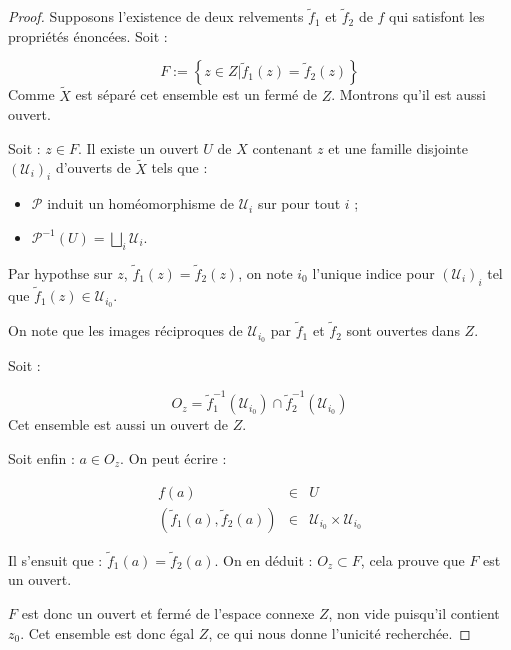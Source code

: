 \begin{proof}
Supposons l'existence de deux relvements $\tilde{f}_1$ et $\tilde{f}_2$ de $f$ qui satisfont les propri\'et\'es \'enonc\'ees. Soit :

\[F:=\left\{z\in Z|\tilde{f}_1(z)=\tilde{f}_2(z)\right\}\]
Comme $\tilde{X}$ est s\'epar\'e cet ensemble est un ferm\'e de $Z$. Montrons qu'il est aussi ouvert.

\par
Soit : $z\in F$. Il existe un ouvert $U$ de $X$ contenant $z$ et une famille disjointe $(\mathcal{U}_i)_i$ d'ouverts de $\tilde{X}$ tels que :

\begin{itemize}
\item $\mathcal{P}$ induit un hom\'eomorphisme de $\mathcal{U}_i$ sur pour tout $i$ ;
\item $\mathcal{P}^{-1}(U)=\bigsqcup\limits_i \mathcal{U}_i$.
\end{itemize}

Par hypothse sur $z$, $\tilde{f}_1(z)=\tilde{f}_2(z)$, on note $i_0$ l'unique indice pour $(\mathcal{U}_i)_i$ tel que $\tilde{f}_1(z)\in\mathcal{U}_{i_0}$.

\par
On note que les images r\'eciproques de $\mathcal{U}_{i_0}$ par $\tilde{f}_1$ et $\tilde{f}_2$ sont ouvertes dans $Z$.

\par
Soit :

\[O_z=\tilde{f}_1^{-1}(\mathcal{U}_{i_0})\cap \tilde{f}_2^{-1}(\mathcal{U}_{i_0})\]
Cet ensemble est aussi un ouvert de $Z$.

Soit enfin : $a\in O_z$. On peut \'ecrire :

\[%
\begin{array}{ccc}
f(a)&\in&U\\
(\tilde{f}_1(a),\tilde{f}_2(a))&\in&\mathcal{U}_{i_0}\times\mathcal{U}_{i_0}
\end{array}
\]

Il s'ensuit que : $\tilde{f}_1(a)=\tilde{f}_2(a)$. On en d\'eduit : $O_z\subset F$, cela prouve que $F$ est un ouvert.

\par
$F$ est donc un ouvert et ferm\'e de l'espace connexe $Z$, non vide puisqu'il contient $z_0$. Cet ensemble est donc \'egal  $Z$, ce qui nous donne l'unicit\'e recherch\'ee.
\end{proof}

